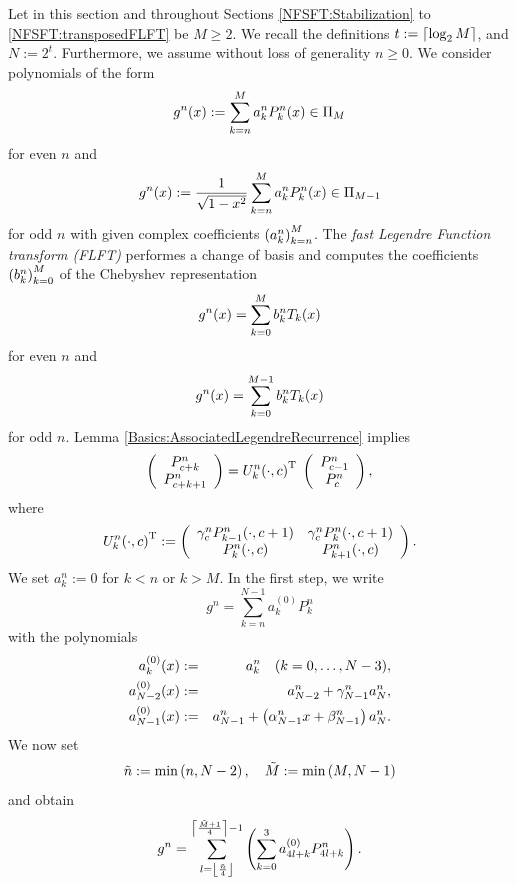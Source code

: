 Let in this section and throughout Sections \ref{NFSFT:Stabilization} to 
\ref {NFSFT:transposedFLFT} be $M \ge 2$. We recall the definitions 
$t := \left\lceil\log_{2}M\right\rceil$, and $N := 2^t$. Furthermore, we assume without loss of generality $n \ge 0$. We consider polynomials of the form
\begin{equation}
  \label{NFSFT:GnEven}
 g^n{\hspace{-0.4ex}}\left(x\right) := \sum_{k=n}^M a_k^n P_k^n{\hspace{-0.4ex}}\left(x\right) \in \Pi_M
 \end{equation}
for even $n$ and
\begin{equation}
  \label{NFSFT:GnOdd}
  g^n{\hspace{-0.4ex}}\left(x\right) := \frac{1}{\sqrt{1-x^2}} \sum_{k=n}^M a_k^n P_k^n{\hspace{-0.4ex}}\left(x\right) \in \Pi_{M-1}
\end{equation}
for odd $n$ with given complex coefficients $\left(a_k^n\right)_{k=n}^M$.
The \emph{fast Legendre Function transform (FLFT)} performes a change of basis and computes the 
coefficients $\left(b_k^n\right)_{k=0}^M$ of the Chebyshev representation
\[ g^n{\hspace{-0.4ex}}\left(x\right) = \sum_{k=0}^M b_k^n T_k{\hspace{-0.4ex}}\left(x\right)\]
for even $n$ and
\[g^n{\hspace{-0.4ex}}\left(x\right) = \sum_{k=0}^{M-1} b_k^n T_k{\hspace{-0.4ex}}\left(x\right)\]
for odd $n$.
Lemma \ref{Basics:AssociatedLegendreRecurrence} implies
\begin{equation}
  \label{NFSFT:U}
  \left(\begin{array}{c}
    P_{c+k}^{n} \\ P_{c+k+1}^{n}
  \end{array}\right)
  =
  U_{k}^{n}{\hspace{-0.4ex}}\left(\cdot,c\right)^{\text{\rm{T}}}\;
  \left(\begin{array}{c}
    P_{c-1}^{n} \\ P_{c}^{n}
  \end{array}\right),
\end{equation}
where
\[
  U_{k}^{n}{\hspace{-0.4ex}}\left(\cdot,c\right)^{\text{\rm{T}}} :=
  \left(\begin{array}{cc}
    \gamma_c^{n} P_{k-1}^{n}{\hspace{-0.4ex}}\left(\cdot,c+1\right) & \gamma_c^{n} P_{k}^{n}{\hspace{-0.4ex}}\left(\cdot,c+1\right) \\
                 P_{k}^{n}{\hspace{-0.4ex}}\left(\cdot,c\right)     &              P_{k+1}^{n}{\hspace{-0.4ex}}\left(\cdot,c\right)
  \end{array}\right).   
\]
We set $a_k^n := 0$ for $k < n$ or $k > M$. In the first step, we write
\[ g^n = \sum_{k = n}^{N-1} a_{k}^{(0)} P_k^{n}\]
with the polynomials
\begin{eqnarray*}
  a_k^{(0)}{\hspace{-0.4ex}}\left(x\right)     & := & a_k^n \quad (k = 0,\ldots,N-3),\\
  a_{N-2}^{(0)}{\hspace{-0.4ex}}\left(x\right) & := & a_{N-2}^n + \gamma_{N-1}^{n} a_N^n,\\
  a_{N-1}^{(0)}{\hspace{-0.4ex}}\left(x\right) & := & a_{N-1}^n + \left(\alpha_{N-1}^{n}x + \beta_{N-1}^{n}\right) a_N^n.
\end{eqnarray*}
We now set 
\[
\tilde{n} := \min{\hspace{-0.4ex}}\left(n,N-2\right), \quad \tilde{M} := \min{\hspace{-0.4ex}}\left(M,N-1\right)
\]
and obtain
\[
  g^n = \sum_{l = \left\lfloor\frac{\tilde{n}}{4}\right\rfloor}^{\left\lceil\frac{\tilde{M}+1}{4}\right\rceil-1} \left(\sum_{k=0}^{3} a_{4l+k}^{(0)} P_{4l+k}^{n}\right).
\]

